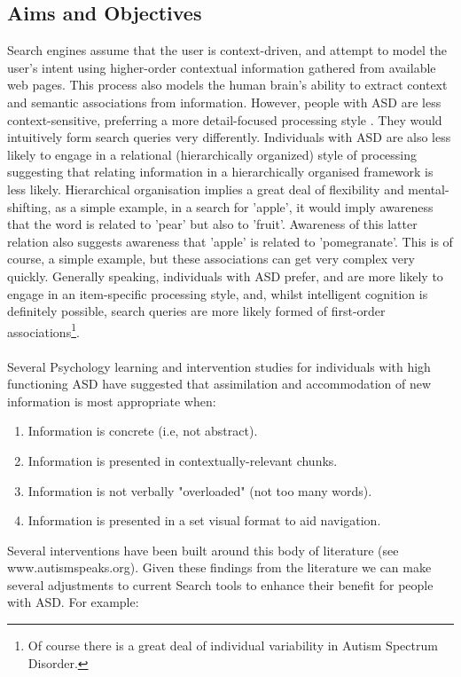 \documentclass[10pt]{article}
\begin{document}
\subsection{Aims and Objectives}\label{the problem}
Search engines assume that the user is context-driven, and attempt to model the user's intent using higher-order contextual information gathered from available web pages. This process also models the human brain's ability to extract context and semantic associations from information. However, people with ASD are less context-sensitive, preferring a more detail-focused processing style \cite{mottron}. They would intuitively form search queries very differently. Individuals with ASD are also less likely to engage in a relational (hierarchically organized) style of processing \cite{bowler} suggesting that relating information in a hierarchically organised framework is less likely. Hierarchical organisation implies a great deal of flexibility and mental-shifting, as a simple example, in a search for 'apple', it would imply awareness that the word is related to 'pear' but also to 'fruit'. Awareness of this latter relation also suggests awareness that 'apple' is related to 'pomegranate'. This is of course, a simple example, but these associations can get very complex very quickly. Generally speaking, individuals with ASD prefer, and are more likely to engage in an item-specific processing style, and, whilst intelligent cognition is definitely possible, search queries are more likely formed of first-order associations\footnote{Of course there is a great deal of individual variability in Autism Spectrum Disorder.}. \\
\\Several Psychology learning and intervention studies for individuals with high functioning ASD have suggested that assimilation and accommodation of new information is most appropriate when:\\
\begin{enumerate}
\item Information is concrete (i.e, not abstract).
\item Information is presented in contextually-relevant chunks.
\item Information is not verbally "overloaded" (not too many words).
\item Information is presented in a set visual format to aid navigation.
\end{enumerate}
Several interventions have been built around this body of literature (see www.autismspeaks.org).
Given these findings from the literature we can make several adjustments to current Search tools to enhance their benefit for people with ASD. For example:
\end{document}
